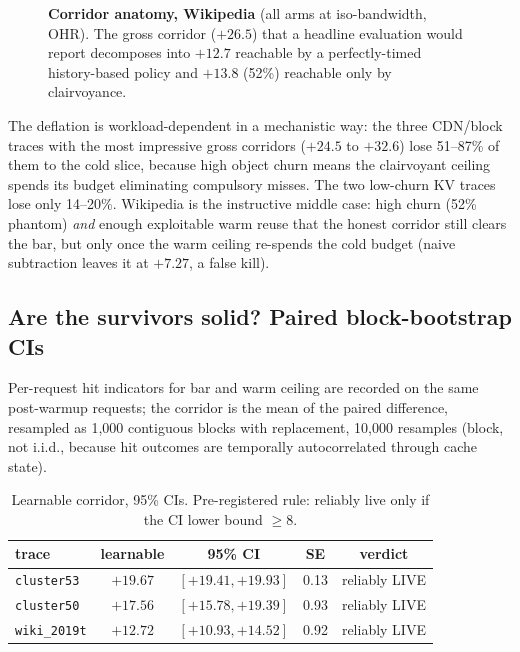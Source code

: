 \documentclass[11pt]{article}
\begin{document}
\begin{figure}[t]
\centering
{}
\caption{\textbf{Corridor anatomy, Wikipedia} (all arms at iso-bandwidth, OHR). The gross corridor ($+26.5$) that a headline evaluation would report decomposes into $+12.7$ reachable by a perfectly-timed history-based policy and $+13.8$ (52\%) reachable only by clairvoyance.}
\label{fig:anatomy}
\end{figure}

The deflation is workload-dependent in a mechanistic way: the three CDN/block traces with the most impressive gross corridors ($+24.5$ to $+32.6$) lose 51--87\% of them to the cold slice, because high object churn means the clairvoyant ceiling spends its budget eliminating compulsory misses. The two low-churn KV traces lose only 14--20\%. Wikipedia is the instructive middle case: high churn (52\% phantom) \emph{and} enough exploitable warm reuse that the honest corridor still clears the bar, but only once the warm ceiling re-spends the cold budget (naive subtraction leaves it at $+7.27$, a false kill).

\subsection{Are the survivors solid? Paired block-bootstrap CIs}
Per-request hit indicators for bar and warm ceiling are recorded on the same post-warmup requests; the corridor is the mean of the paired difference, resampled as 1{,}000 contiguous blocks with replacement, 10{,}000 resamples (block, not i.i.d., because hit outcomes are temporally autocorrelated through cache state).

\begin{table}[h]\centering\footnotesize
\caption{Learnable corridor, 95\% CIs. Pre-registered rule: reliably live only if the CI lower bound $\geq 8$.}
\label{tab:boot}
\begin{tabular}{lcccc}
\toprule
trace & learnable & 95\% CI & SE & verdict \\
\midrule
\texttt{cluster53} & $+19.67$ & $[+19.41,+19.93]$ & 0.13 & reliably LIVE \\
\texttt{cluster50} & $+17.56$ & $[+15.78,+19.39]$ & 0.93 & reliably LIVE \\
\texttt{wiki\_2019t} & $+12.72$ & $[+10.93,+14.52]$ & 0.92 & reliably LIVE \\
\bottomrule
\end{tabular}
\end{table}
\end{document}

